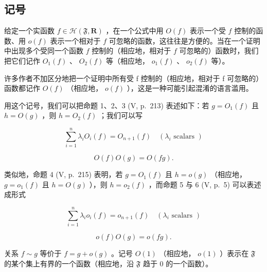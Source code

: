 \subsection{记号}

给定一个实函数 \(f \in \mathcal{H}(\mathfrak{F}, \mathbf{R})\) ，在一个公式中用 \(O(f)\) 表示一个受 \(f\) 控制的函数、用 \(o(f)\) 表示一个相对于 \(f\) 可忽略的函数，这往往是方便的。当在一个证明中出现多个受同一个函数 \(f\) 控制的（相应地，相对于 \(f\) 可忽略的）函数时，我们把它们记作 \(O_1(f)\) 、 \(O_2(f)\) 等（相应地， \(o_1(f)\) 、 \(o_2(f)\) 等）。

许多作者不加区分地把一个证明中所有受 f 控制的（相应地，相对于 f 可忽略的）函数都记作 \(O(f)\) （相应地， \(o(f)\) ），这是一种可能引起混淆的语言滥用。

用这个记号，我们可以把命题 1、2、3 (V, p.~213) 表述如下：若 \(g = O_1(f)\) 且 \(h = O(g)\) ，则 \(h = O_2(f)\) ；我们可以写

\[
\sum_ {i = 1} ^ {n} \lambda_ {i} O _ {i} (f) = O _ {n + 1} (f) \quad (\lambda_ {i} \text {   scalars })\tag{1}
\]

\[
O (f) O (g) = O (f g).\tag{2}
\]

类似地，命题 4 (V, p.~215) 表明，若 \(g = O_1(f)\) 且 \(h = o(g)\) （相应地， \(g = o_1(f)\) 且 \(h = O(g)\) ），则 \(h = o_2(f)\) ，而命题 5 与 6 (V, p.~5) 可以表述成形式

\[
\sum_ {i = 1} ^ {n} \lambda_ {i} o _ {i} (f) = o _ {n + 1} (f) \quad (\lambda_ {i} \text {   scalars })\tag{3}
\]

\[
o (f) O (g) = o (f g).\tag{4}
\]

关系 \(f \sim g\) 等价于 \(f = g + o(g)\) 。记号 \(O(1)\) （相应地， \(o(1)\) ）表示在 \(\mathfrak{F}\) 的某个集上有界的一个函数（相应地，沿 \(\mathfrak{F}\) 趋于 0 的一个函数）。

